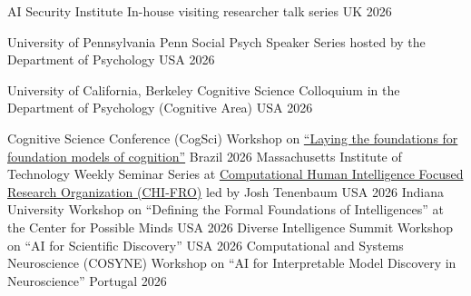 



\begin{cvhonors}


    \cvhonor
    {AI Security Institute} %
    {In-house visiting researcher talk series} 
    {UK} %
    {2026} %


    \cvhonor
    {University of Pennsylvania} %
    {Penn Social Psych Speaker Series hosted by the Department of Psychology} 
    {USA} %
    {2026} %


    \cvhonor
    {University of California, Berkeley} %
    {Cognitive Science Colloquium in the Department of Psychology (Cognitive Area)} 
    {USA} %
    {2026} %


    \cvhonor
    {Cognitive Science Conference (CogSci)} %
    {Workshop on \href{https://escholarship.org/uc/item/0bc9g9w3}{“Laying the foundations for foundation models of cognition”}} 
    {Brazil} %
    {2026} %
    \cvhonor
    {Massachusetts Institute of Technology} %
    {Weekly Seminar Series at \href{https://www.chi-fro.org/}{Computational Human Intelligence Focused Research Organization (CHI-FRO)} led by Josh Tenenbaum} 
    {USA} %
    {2026} %
    \cvhonor
    {Indiana University} %
    {Workshop on “Defining the Formal Foundations of Intelligences” at the Center for Possible Minds} 
    {USA} %
    {2026} %
    \cvhonor
    {Diverse Intelligence Summit} %
    {Workshop on “AI for Scientific Discovery”} 
    {USA} %
    {2026} %
    \cvhonor
    {Computational and Systems Neuroscience (COSYNE)} %
    {Workshop on “AI for Interpretable Model Discovery in Neuroscience”} 
    {Portugal} %
    {2026} %
    

\end{cvhonors}
